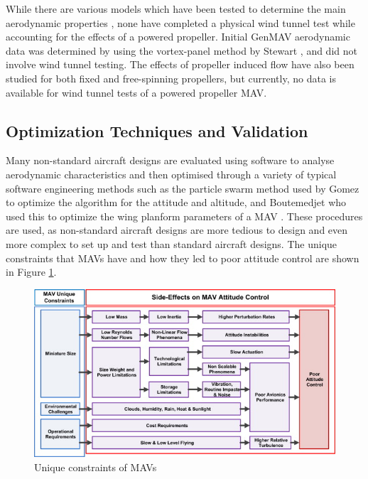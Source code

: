 While there are various models which have been tested to determine the main aerodynamic properties \cite{Stewart2007} \cite{Aboelezz2020}, none have completed a physical wind tunnel test while accounting for the effects of a powered propeller. Initial \acrshort{GenMAV} aerodynamic data was determined by using the vortex-panel method by Stewart \cite{Stewart2007}, and did not involve wind tunnel testing. The effects of propeller induced flow have also been studied for both fixed and free-spinning propellers, but currently, no data is available for wind tunnel tests of a powered propeller \acrshort{MAV}.

\subsection{Optimization Techniques and Validation}
\label{subsec:Optimization}
Many non-standard aircraft designs are evaluated using software to analyse aerodynamic characteristics and then optimised through a variety of typical software engineering methods such as the particle swarm method used by Gomez to optimize the algorithm for the attitude and altitude, and Boutemedjet who used this to optimize the wing planform parameters of a \acrshort{MAV} \cite{Gomez2020, Boutemedjet2019}. These procedures are used, as non-standard aircraft designs are more tedious to design and even more complex to set up and test than standard aircraft designs. The unique constraints that \acrshort{MAV}s have and how they led to poor attitude control are shown in Figure \ref{fig:MAVconstrain}.

\begin{figure}[H]
  \centering
   \includegraphics[width=\linewidth]{03_LiteratureReview/Figs/fowchart.jpg}
  \caption{Unique constraints of \acrshort{MAV}s \cite{Mohamed2014}}
  \label{fig:MAVconstrain}
\end{figure}

